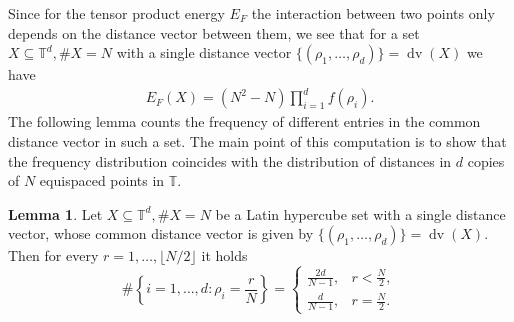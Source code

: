 \documentclass[a4paper,12pt]{article}
\numberwithin{equation}{section}
\theoremstyle{definition}
\newtheorem{lem}[thm]{Lemma}
\newcommand{\bbT}{\mathbb{T}}
\newcommand{\sbse}{\subseteq}
\newcommand{\dv}{\operatorname{dv}}
\begin{document}
Since for the tensor product energy $E_F$ the interaction between two points only depends on the distance vector between them, we see that for a set $X \sbse \bbT^d, \#X = N$ with a single distance vector $\{(\rho_1, \dots, \rho_d)\} = \dv(X)$ we have
\begin{align} \label{eq:uds_energy}
    E_F(X) = (N^2-N) \prod_{i=1}^d f(\rho_i).
\end{align}
The following lemma counts the frequency of different entries in  the common distance vector in  such a set.  The main point of this computation is to show that the frequency distribution coincides with the distribution of distances in $d$ copies of $N$ equispaced points  in   $\mathbb T$. 








\begin{lem} \label{lem:double_counting}
    Let $X \sbse \bbT^d, \#X=N$ be a Latin hypercube set with a  single distance vector, whose common distance vector is given by $\{(\rho_1, \dots, \rho_d)\} = \dv(X)$. Then for every $r = 1, \dots, \lfloor N/2 \rfloor$ it holds
    $$
    \#\left\{i=1, \dots, d: \rho_i = \frac rN\right\} =  \begin{cases}
        \frac{2d}{N-1}, & r < \frac N2, \\
        \frac d{N-1}, &  r = \frac N2.
    \end{cases}
    $$
\end{lem}
\end{document}
